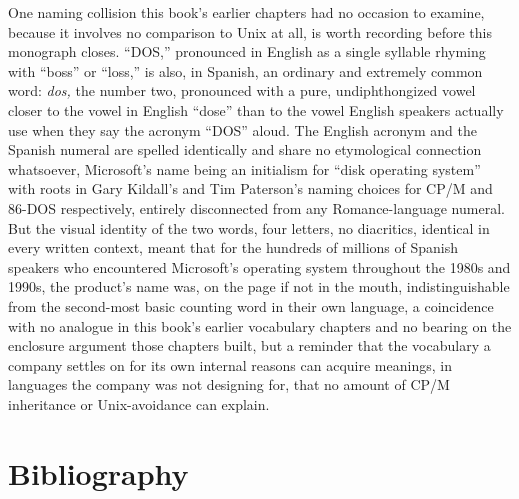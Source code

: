 \documentclass[11pt]{book}
\begin{document}
One naming collision this book's earlier chapters had no occasion to examine, because it involves no comparison to Unix at all, is worth recording before this monograph closes. \enquote{DOS,} pronounced in English as a single syllable rhyming with \enquote{boss} or \enquote{loss,} is also, in Spanish, an ordinary and extremely common word: \emph{dos,} the number two, pronounced with a pure, undiphthongized vowel closer to the vowel in English \enquote{dose} than to the vowel English speakers actually use when they say the acronym \enquote{DOS} aloud. The English acronym and the Spanish numeral are spelled identically and share no etymological connection whatsoever, Microsoft's name being an initialism for \enquote{disk operating system} with roots in Gary Kildall's and Tim Paterson's naming choices for CP/M and 86-DOS respectively, entirely disconnected from any Romance-language numeral. But the visual identity of the two words, four letters, no diacritics, identical in every written context, meant that for the hundreds of millions of Spanish speakers who encountered Microsoft's operating system throughout the 1980s and 1990s, the product's name was, on the page if not in the mouth, indistinguishable from the second-most basic counting word in their own language, a coincidence with no analogue in this book's earlier vocabulary chapters and no bearing on the enclosure argument those chapters built, but a reminder that the vocabulary a company settles on for its own internal reasons can acquire meanings, in languages the company was not designing for, that no amount of CP/M inheritance or Unix-avoidance can explain.

\backmatter

\chapter*{Bibliography}
\end{document}
